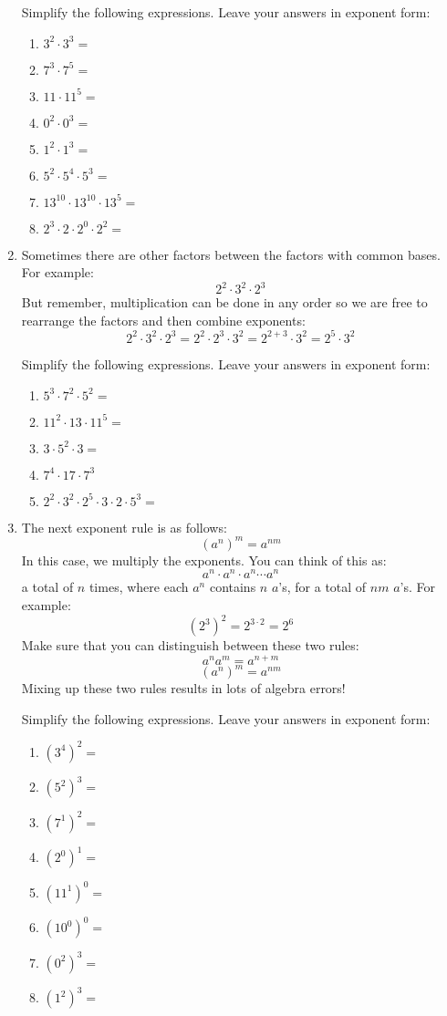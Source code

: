 \documentclass[letterpaper,12pt,fleqn]{article}
\begin{document}
\begin{enumerate}
  Simplify the following expressions. Leave your answers in exponent form:
  \begin{enumerate}
  \item $3^2\cdot3^3=$
  \item $7^3\cdot7^5=$
  \item $11\cdot11^5=$
  \item $0^2\cdot0^3=$
  \item $1^2\cdot1^3=$
  \item $5^2\cdot5^4\cdot5^3=$
  \item $13^{10}\cdot13^{10}\cdot13^5=$
  \item $2^3\cdot2\cdot2^0\cdot2^2=$
  \end{enumerate}

\item Sometimes there are other factors between the factors with common bases.
  For example:
  \[2^2\cdot 3^2\cdot2^3\]
  But remember, multiplication can be done in any order so we are free to
  rearrange the factors and then combine exponents:
  \[2^2\cdot 3^2\cdot2^3=2^2\cdot2^3\cdot3^2=2^{2+3}\cdot3^2=2^5\cdot3^2\]

  Simplify the following expressions. Leave your answers in exponent form:
  \begin{enumerate}
  \item $5^3\cdot7^2\cdot5^2=$
  \item $11^2\cdot13\cdot11^5=$
  \item $3\cdot5^2\cdot3=$
  \item $7^4\cdot17\cdot7^3$
  \item $2^2\cdot3^2\cdot2^5\cdot3\cdot2\cdot5^3=$
  \end{enumerate}

\item The next exponent rule is as follows:
  \[(a^n)^m=a^{nm}\]
  In this case, we multiply the exponents. You can think of this as:
  \[a^n\cdot a^n\cdot a^n\cdots a^n\]
  a total of $n$ times, where each $a^n$ contains $n$ $a$'s, for a total of
  $nm$ $a$'s. For example:
  \[(2^3)^2=2^{3\cdot2}=2^6\]
  Make sure that you can distinguish between these two rules:
  \[a^na^m=a^{n+m}\]
  \[(a^n)^m=a^{nm}\]
  Mixing up these two rules results in lots of algebra errors!

  Simplify the following expressions. Leave your answers in exponent form:
  \begin{enumerate}
  \item $(3^4)^2=$
  \item $(5^2)^3=$
  \item $(7^1)^2=$
  \item $(2^0)^1=$
  \item $(11^1)^0=$
  \item $(10^0)^0=$
  \item $(0^2)^3=$
  \item $(1^2)^3=$
  \end{enumerate}


\end{enumerate}
\end{document}
